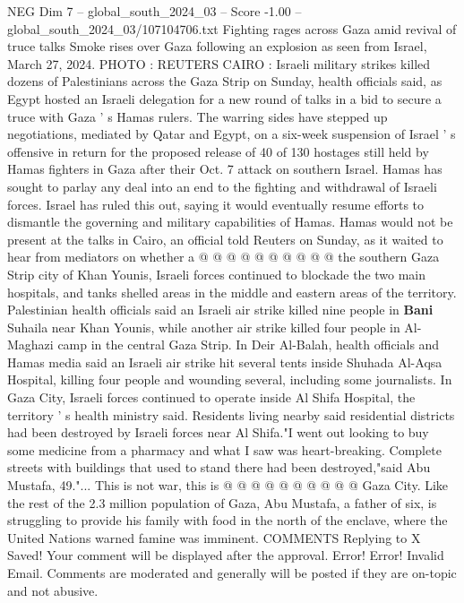\begin{textsample}{NEG Dim 7 – global\_south\_2024\_03 – Score -1.00 – global\_south\_2024\_03/107104706.txt}  \label{ex:f7_neg_290}
Fighting rages across Gaza amid revival of truce talks Smoke rises over Gaza following an explosion as seen from Israel, March 27, 2024.
PHOTO : REUTERS CAIRO : Israeli military strikes killed dozens of Palestinians across the Gaza Strip on Sunday, health officials said, as Egypt hosted an Israeli delegation for a new round of talks in a bid to secure a truce with Gaza ' s Hamas rulers.
The warring sides have stepped up negotiations, mediated by Qatar and Egypt, on a six-week suspension of Israel ' s offensive in return for the proposed release of 40 of 130 hostages still held by Hamas fighters in Gaza after their Oct. 7 attack on southern Israel.
Hamas has sought to parlay any deal into an end to the fighting and withdrawal of Israeli forces.
Israel has ruled this out, saying it would eventually resume efforts to dismantle the governing and military capabilities of Hamas.
Hamas would not be present at the talks in Cairo, an official told Reuters on Sunday, as it waited to hear from mediators on whether a @ @ @ @ @ @ @ @ @ @ the southern Gaza Strip city of Khan Younis, Israeli forces continued to blockade the two main hospitals, and tanks shelled areas in the middle and eastern areas of the territory.
Palestinian health officials said an Israeli air strike killed nine people in \textbf{Bani} Suhaila near Khan Younis, while another air strike killed four people in Al-Maghazi camp in the central Gaza Strip.
In Deir Al-Balah, health officials and Hamas media said an Israeli air strike hit several tents inside Shuhada Al-Aqsa Hospital, killing four people and wounding several, including some journalists.
In Gaza City, Israeli forces continued to operate inside Al Shifa Hospital, the territory ' s health ministry said.
Residents living nearby said residential districts had been destroyed by Israeli forces near Al Shifa."I went out looking to buy some medicine from a pharmacy and what I saw was heart-breaking.
Complete streets with buildings that used to stand there had been destroyed,"said Abu Mustafa, 49."...
This is not war, this is @ @ @ @ @ @ @ @ @ @ Gaza City.
Like the rest of the 2.3 million population of Gaza, Abu Mustafa, a father of six, is struggling to provide his family with food in the north of the enclave, where the United Nations warned famine was imminent.
COMMENTS Replying to X Saved!
Your comment will be displayed after the approval.
Error!
Error!
Invalid Email.
Comments are moderated and generally will be posted if they are on-topic and not abusive.

\end{textsample}

